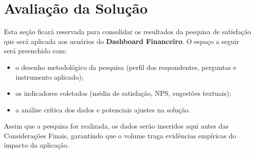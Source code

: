 \chapter{\label{chap:chap5}Avaliação da Solução}

Esta seção ficará reservada para consolidar os resultados da pesquisa de satisfação que será aplicada aos usuários do \textbf{Dashboard Financeiro}. O espaço a seguir será preenchido com:
\begin{itemize}
    \item o desenho metodológico da pesquisa (perfil dos respondentes, perguntas e instrumento aplicado);
    \item os indicadores coletados (média de satisfação, NPS, sugestões textuais);
    \item a análise crítica dos dados e potenciais ajustes na solução.
\end{itemize}

Assim que a pesquisa for realizada, os dados serão inseridos aqui antes das Considerações Finais, garantindo que o volume traga evidências empíricas do impacto da aplicação.
